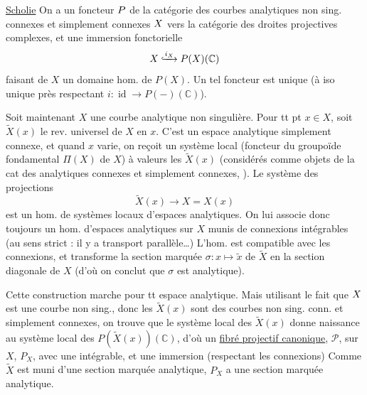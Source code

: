 \uline{Scholie} On a un foncteur ${P}$ de la catégorie des courbes analytiques non sing. connexes et simplement connexes ${X}$ vers la catégorie des droites projectives complexes, et une immersion fonctorielle
\[X\lhook\joinrel\xrightarrow{i_X}P(X)(\mathbb C)\]
faisant de $X$ un domaine  hom. de $P(X)$.
Un tel foncteur est unique (à iso unique près respectant $i:\operatorname{id}\longrightarrow P(-)(\mathbb C)$).

Soit maintenant $X$ une courbe analytique non singulière. Pour tt pt $x\in X$, soit $\widetilde X(x)$ le rev. universel de $X$ en $x$. C'est un espace analytique simplement connexe, et quand $x$ varie, on reçoit un système local (foncteur du groupoïde fondamental $\Pi(X)$ de $X$) à valeurs les $\widetilde X(x)$ (considérés comme objets de la cat des  analytiques connexes et simplement connexes, ). Le système des projections
\[\widetilde X(x)\longrightarrow X=X(x)\]
est un hom. de systèmes locaux d'espaces analytiques. On lui associe donc toujours un hom. d'espaces analytiques sur $X$
munis de connexions intégrables (au sens strict : il y a transport parallèle\ldots)
L'hom. est compatible avec les connexions, et transforme la section marquée $\sigma:x\mapsto\widetilde x$ de $\widetilde X$ en la section diagonale de $X$ (d'où on conclut que $\sigma$ est analytique).

Cette construction marche pour tt espace analytique. Mais utilisant le fait que ${X}$ est une courbe non sing., donc les $\widetilde X(x)$ sont des courbes non sing. conn. et simplement connexes, on trouve que le système local des $\widetilde X(x)$ donne naissance au système local des $P(\widetilde X(x))(\mathbb C)$, d'où un \uline{fibré projectif canonique}, $\mathcal P$, sur
$X$, $P_X$, avec une  intégrable, et une immersion  (respectant les connexions)
Comme $\widetilde X$ est muni d'une section marquée analytique, $P_X$ a une section marquée analytique.

